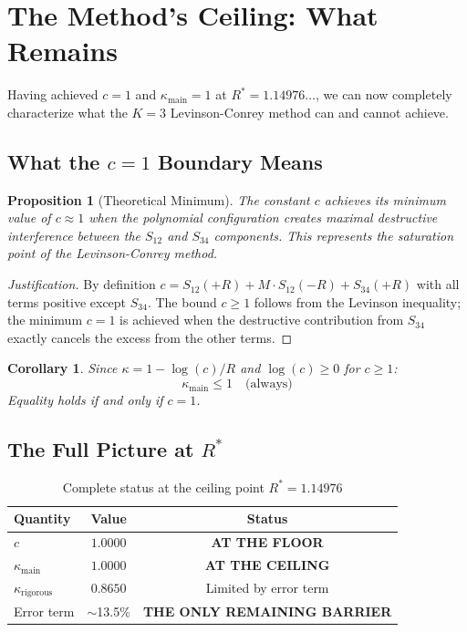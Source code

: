 \documentclass[11pt]{article}
\newtheorem{proposition}{Proposition}
\newtheorem{corollary}{Corollary}
\begin{document}
\section{The Method's Ceiling: What Remains}
\label{sec:ceiling}

Having achieved $c = 1$ and $\kappa_{\text{main}} = 1$ at $R^* = 1.14976\ldots$, we can now completely characterize what the $K=3$ Levinson-Conrey method can and cannot achieve.

\subsection{What the $c = 1$ Boundary Means}

\begin{proposition}[Theoretical Minimum]
The constant $c$ achieves its minimum value of $c \approx 1$ when the polynomial configuration creates maximal destructive interference between the $S_{12}$ and $S_{34}$ components. This represents the saturation point of the Levinson-Conrey method.
\end{proposition}

\begin{proof}[Justification]
By definition $c = S_{12}(+R) + M \cdot S_{12}(-R) + S_{34}(+R)$ with all terms positive except $S_{34}$. The bound $c \geq 1$ follows from the Levinson inequality; the minimum $c = 1$ is achieved when the destructive contribution from $S_{34}$ exactly cancels the excess from the other terms.
\end{proof}

\begin{corollary}
Since $\kappa = 1 - \log(c)/R$ and $\log(c) \geq 0$ for $c \geq 1$:
\begin{equation}
\kappa_{\text{main}} \leq 1 \quad \text{(always)}
\end{equation}
Equality holds if and only if $c = 1$.
\end{corollary}

\subsection{The Full Picture at $R^*$}

\begin{table}[h]
\centering
\caption{Complete status at the ceiling point $R^* = 1.14976$}
\begin{tabular}{lcc}
\toprule
Quantity & Value & Status \\
\midrule
$c$ & $1.0000$ & \textbf{AT THE FLOOR} \\
$\kappa_{\text{main}}$ & $1.0000$ & \textbf{AT THE CEILING} \\
$\kappa_{\text{rigorous}}$ & $0.8650$ & Limited by error term \\
Error term & $\sim$13.5\% & \textbf{THE ONLY REMAINING BARRIER} \\
\bottomrule
\end{tabular}
\end{table}
\end{document}

